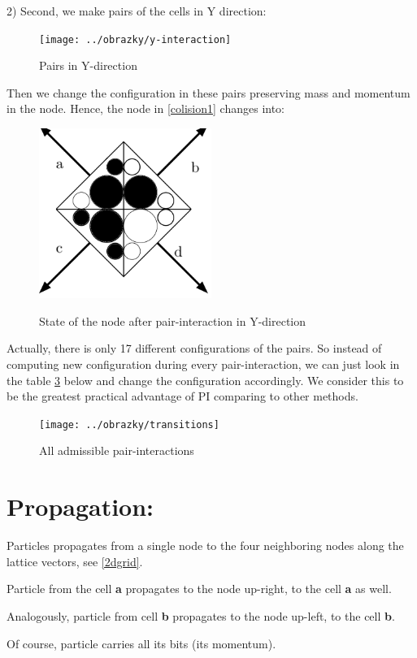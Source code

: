 2) Second, we make pairs of the cells in Y direction:
\begin{figure}[htbp]
 \centering 
 \texttt{[image: ../obrazky/y-interaction]}
 \label{yinter}
 \caption{Pairs in Y-direction}
\end{figure}

 Then we change the configuration in these pairs preserving mass and momentum in the node. Hence, the node in \ref{colision1} changes into:
 \begin{figure}[htbp]
 \centering 
 \includegraphics[width=0.5\textwidth]{./img/node_3}
 \label{colision2}
 \caption{State of the node after pair-interaction in Y-direction}
\end{figure}
\newpage
Actually, there is only 17 different configurations of the pairs. So instead of computing new configuration during every pair-interaction, we can just look in the table \ref{transitions} below and change the configuration accordingly. We consider this to be the greatest practical advantage of PI comparing to other methods.
\newpage
\begin{figure}[htbp]
 \centering 
 \texttt{[image: ../obrazky/transitions]}
 \label{transitions}
 \caption{All admissible pair-interactions}
\end{figure}

\section{Propagation:}
Particles propagates from a single node to the four neighboring nodes along the lattice vectors, see \ref{2dgrid}.

Particle from the cell \textbf{a} propagates to the node up-right, to the cell \textbf{a} as well.

Analogously, particle from cell \textbf{b} propagates to the node up-left, to the cell \textbf{b}.

Of course, particle carries all its bits (its momentum).



